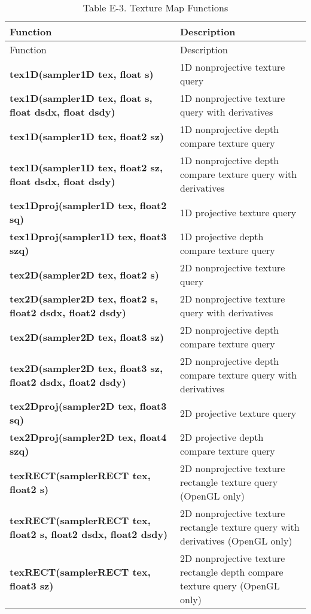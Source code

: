 \documentclass[../main.tex]{subfiles}
\begin{document}
\FloatBarrier
\begin{longtable}{ p{5cm} p{7cm}  }
\caption{Table E-3. Texture Map Functions\label{table:E-3}} \\

Function & Description \\
\hline
\endfirsthead
Function & Description \\
\hline
\endhead
\endfoot
\endlastfoot

\textbf{tex1D(sampler1D tex, float s)} & 1D nonprojective texture query \\
\hline
\textbf{tex1D(sampler1D tex, float s, float dsdx, float dsdy)} & 1D nonprojective texture query with derivatives \\
\hline
\textbf{tex1D(sampler1D tex, float2 sz)} & 1D nonprojective depth compare texture query \\
\hline
\textbf{tex1D(sampler1D tex, float2 sz, float dsdx, float dsdy)} & 1D nonprojective depth compare texture query with derivatives \\
\hline
\textbf{tex1Dproj(sampler1D tex, float2 sq)} & 1D projective texture query \\
\hline
\textbf{tex1Dproj(sampler1D tex, float3 szq)} & 1D projective depth compare texture query \\
\hline
\textbf{tex2D(sampler2D tex, float2 s)} & 2D nonprojective texture query \\
\hline
\textbf{tex2D(sampler2D tex, float2 s, float2 dsdx, float2 dsdy)} & 2D nonprojective texture query with derivatives \\
\hline
\textbf{tex2D(sampler2D tex, float3 sz)} & 2D nonprojective depth compare texture query \\
\hline
\textbf{tex2D(sampler2D tex, float3 sz, float2 dsdx, float2 dsdy)} & 2D nonprojective depth compare texture query with derivatives \\
\hline
\textbf{tex2Dproj(sampler2D tex, float3 sq)} & 2D projective texture query \\
\hline
\textbf{tex2Dproj(sampler2D tex, float4 szq)} & 2D projective depth compare texture query \\
\hline
\textbf{texRECT(samplerRECT tex, float2 s)} & 2D nonprojective texture rectangle texture query (OpenGL only) \\
\hline
\textbf{texRECT(samplerRECT tex, float2 s, float2 dsdx, float2 dsdy)} & 2D nonprojective texture rectangle texture query with derivatives (OpenGL only) \\
\hline
\textbf{texRECT(samplerRECT tex, float3 sz)} & 2D nonprojective texture rectangle depth compare texture query (OpenGL only) \\

\end{longtable}
\end{document}
